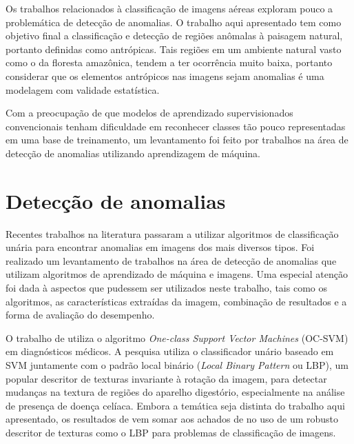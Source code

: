 Os trabalhos relacionados à classificação de imagens aéreas exploram pouco a problemática de detecção de anomalias. O trabalho aqui apresentado tem como objetivo final a classificação e detecção de regiões anômalas à paisagem natural, portanto definidas como antrópicas. Tais regiões em um ambiente natural vasto como o da floresta amazônica, tendem a ter ocorrência muito baixa, portanto considerar que os elementos antrópicos nas imagens sejam anomalias é uma modelagem com validade estatística.

Com a preocupação de que modelos de aprendizado supervisionados convencionais tenham dificuldade em reconhecer classes tão pouco representadas em uma base de treinamento, um levantamento foi feito por trabalhos na área de detecção de anomalias utilizando aprendizagem de máquina.

\section{Detecção de anomalias}\label{sec:trAnomalias}

Recentes trabalhos na literatura passaram a utilizar algoritmos de classificação unária para encontrar anomalias em imagens dos mais diversos tipos. Foi realizado um levantamento de trabalhos na área de detecção de anomalias que utilizam algoritmos de aprendizado de máquina e imagens. Uma especial atenção foi dada à aspectos que pudessem ser utilizados neste trabalho, tais como os algoritmos, as características extraídas da imagem, combinação de resultados e a forma de avaliação do desempenho.

O trabalho de  utiliza o algoritmo \textit{One-class Support Vector Machines} (OC-SVM) em diagnósticos médicos. A pesquisa utiliza o classificador unário baseado em SVM juntamente com o padrão local binário (\textit{Local Binary Pattern} ou LBP), um popular descritor de texturas invariante à rotação da imagem, para detectar mudanças na textura de regiões do aparelho digestório, especialmente na análise de presença de doença celíaca. Embora a temática seja distinta do trabalho aqui apresentado,  os resultados de  vem somar aos achados de  no uso de um robusto descritor de texturas como o LBP para problemas de classificação de imagens.

